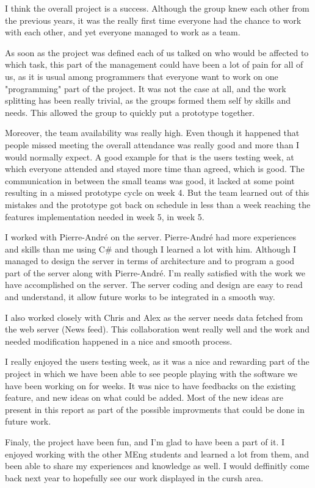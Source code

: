 I think the overall project is a success. Although the group knew each
other from the previous years, it was the really first time everyone had
the chance to work with each other, and yet everyone managed to work as a
team. 

As soon as the project was defined each of us talked on who would be
affected to which task, this part of the management could have been a
lot of pain for all of us, as it is usual among programmers that everyone
want to work on one "programming" part of the project. It was not the
case at all, and the work splitting has been really trivial, as the
groups formed them self by skills and needs. This allowed the group
to quickly put a prototype together.

Moreover, the team availability was really high. Even though it happened
that people missed meeting the overall attendance was really good and
more than I would normally expect. A good example for that is the users
testing week, at which everyone attended and stayed more time than
agreed, which is good. The communication in between the small teams was
good, it lacked at some point resulting in a missed prototype cycle
on week 4. But the team learned out of this mistakes and the prototype
got back on schedule in less than a week reaching the features
implementation needed in week 5, in week 5.

I worked with Pierre-André on the server. Pierre-André had more experiences
and skills than me using C# and though I learned a lot with him.
Although I managed to design the server in terms of architecture and to
program a good part of the server along with Pierre-André. I'm really
satisfied with the work we have accomplished on the server. The server
coding and design are easy to read and understand, it allow future works
to be integrated in a smooth way.

I also worked closely with Chris and Alex as the server needs data fetched
from the web server (News feed). This collaboration went really well and
the work and needed modification happened in a nice and smooth process.

I really enjoyed the users testing week, as it was a nice and rewarding 
part of the project in which we have been able to see people playing with
the software we have been working on for weeks. It was nice to have feedbacks
on the existing feature, and new ideas on what could be added. Most of the
new ideas are present in this report as part of the possible improvments that
could be done in future work.

Finaly, the project have been fun, and I'm glad to have been a part of it.
I enjoyed working with the other MEng students and learned a lot from them,
and been able to share my experiences and knowledge as well. I would deffinitly
come back next year to hopefully see our work displayed in the cursh area.